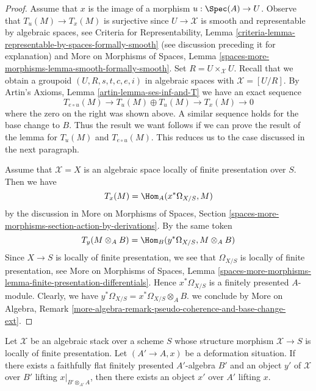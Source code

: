 \begin{proof}
\medskip\noindent
Assume that $x$ is the image of a morphism $u : \Spec(A) \to U$.
Observe that $T_u(M) \to T_x(M)$ is surjective since
$U \to \mathcal{X}$ is smooth and representable by
algebraic spaces, see Criteria for Representability, Lemma
\ref{criteria-lemma-representable-by-spaces-formally-smooth}
(see discussion preceding it for explanation) and
More on Morphisms of Spaces, Lemma
\ref{spaces-more-morphisms-lemma-smooth-formally-smooth}.
Set $R = U \times_\mathcal{X} U$. Recall that we obtain
a groupoid $(U, R, s, t, c, e, i)$ in algebraic spaces with
$\mathcal{X} = [U/R]$. By
Artin's Axioms, Lemma \ref{artin-lemma-ses-inf-and-T}
we have an exact sequence
$$
T_{e \circ u}(M) \to T_u(M) \oplus T_u(M) \to T_x(M) \to 0
$$
where the zero on the right was shown above. A similar sequence
holds for the base change to $B$. Thus the result we want follows if
we can prove the result of the lemma for
$T_u(M)$ and $T_{e \circ u}(M)$. This reduces us to the case discussed
in the next paragraph.

\medskip\noindent
Assume that $\mathcal{X} = X$ is an algebraic space locally of finite
presentation over $S$. Then we have
$$
T_x(M) = \Hom_A(x^*\Omega_{X/S}, M)
$$
by the discussion in More on Morphisms of Spaces, Section
\ref{spaces-more-morphisms-section-action-by-derivations}.
By the same token
$$
T_y(M \otimes_A B) = \Hom_B(y^*\Omega_{X/S}, M \otimes_A B)
$$
Since $X \to S$ is locally of finite presentation, we see that
$\Omega_{X/S}$ is locally of finite presentation, see
More on Morphisms of Spaces, Lemma
\ref{spaces-more-morphisms-lemma-finite-presentation-differentials}.
Hence $x^*\Omega_{X/S}$ is a finitely presented $A$-module.
Clearly, we have $y^*\Omega_{X/S} = x^*\Omega_{X/S} \otimes_A B$.
we conclude by More on Algebra, Remark
\ref{more-algebra-remark-pseudo-coherence-and-base-change-ext}.
\end{proof}

\begin{lemma}
\label{lemma-local-lift-enough}
Let $\mathcal{X}$ be an algebraic stack over a scheme $S$ whose
structure morphism $\mathcal{X} \to S$ is locally of finite presentation.
Let $(A' \to A, x)$ be a deformation situation. If there exists a
faithfully flat finitely presented $A'$-algebra $B'$ and an
object $y'$ of $\mathcal{X}$ over $B'$ lifting $x|_{B' \otimes_{A'} A}$,
then there exists an object $x'$ over $A'$ lifting $x$.
\end{lemma}

